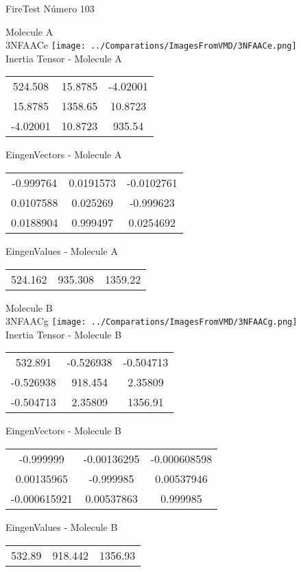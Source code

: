 \vtab[-2cm]
\begin{center}
{\large FireTest \tab Número 103}
\end{center}
\begin{multicols}{2}
\begin{center}

Molecule A \\ 
3NFAACe
\texttt{[image: ../Comparations/ImagesFromVMD/3NFAACe.png]}
\\
Inertia Tensor - Molecule A \\
\vtab

\begin{tabular}{|c c c|}
524.508	 & 	15.8785	 & 	-4.02001	 \\
15.8785	 & 	1358.65	 & 	10.8723	 \\
-4.02001	 & 	10.8723	 & 	935.54
\end{tabular}

\vtab
 EingenVectors - Molecule A     \\
\vtab
\begin{tabular}{|c c c|}
-0.999764	 & 	0.0191573	 & 	-0.0102761	 \\
0.0107588	 & 	0.025269	 & 	-0.999623	 \\
0.0188904	 & 	0.999497	 & 	0.0254692
\end{tabular}

\vtab
 EingenValues - Molecule A     \\
\vtab
\begin{tabular}{|c c c|}
524.162	 & 	935.308	 & 	1359.22	 \\
\end{tabular}
\columnbreak

Molecule B \\ 
3NFAACg
\texttt{[image: ../Comparations/ImagesFromVMD/3NFAACg.png]}
\\
Inertia Tensor - Molecule B \\
\vtab

\begin{tabular}{|c c c|}
532.891	 & 	-0.526938	 & 	-0.504713	 \\
-0.526938	 & 	918.454	 & 	2.35809	 \\
-0.504713	 & 	2.35809	 & 	1356.91
\end{tabular}

\vtab
 EingenVectors - Molecule B     \\
\vtab
\begin{tabular}{|c c c|}
-0.999999	 & 	-0.00136295	 & 	-0.000608598	 \\
0.00135965	 & 	-0.999985	 & 	0.00537946	 \\
-0.000615921	 & 	0.00537863	 & 	0.999985
\end{tabular}

\vtab
 EingenValues - Molecule B     \\
\vtab
\begin{tabular}{|c c c|}
532.89	 & 	918.442	 & 	1356.93	 \\
\end{tabular}

\end{center}
\end{multicols}
